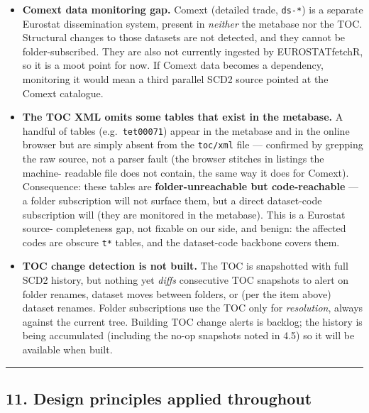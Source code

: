\documentclass[
]{article}
\begin{document}
\begin{itemize}
  by the scheduled account, all alerting fails silently --- no alerts,
  no failure emails. \emph{Mitigation:} periodically confirm alerts
  still arrive; consider a heartbeat or second channel if the system
  becomes critical.
\item
  \textbf{Comext data monitoring gap.} Comext (detailed trade,
  \texttt{ds-*}) is a separate Eurostat dissemination system, present in
  \emph{neither} the metabase nor the TOC. Structural changes to those
  datasets are not detected, and they cannot be folder-subscribed. They
  are also not currently ingested by EUROSTATfetchR, so it is a moot
  point for now. If Comext data becomes a dependency, monitoring it
  would mean a third parallel SCD2 source pointed at the Comext
  catalogue.
\item
  \textbf{The TOC XML omits some tables that exist in the metabase.} A
  handful of tables (e.g.~\texttt{tet00071}) appear in the metabase and
  in the online browser but are simply absent from the \texttt{toc/xml}
  file --- confirmed by grepping the raw source, not a parser fault (the
  browser stitches in listings the machine- readable file does not
  contain, the same way it does for Comext). Consequence: these tables
  are \textbf{folder-unreachable but code-reachable} --- a folder
  subscription will not surface them, but a direct dataset-code
  subscription will (they are monitored in the metabase). This is a
  Eurostat source- completeness gap, not fixable on our side, and
  benign: the affected codes are obscure \texttt{t*} tables, and the
  dataset-code backbone covers them.
\item
  \textbf{TOC change detection is not built.} The TOC is snapshotted
  with full SCD2 history, but nothing yet \emph{diffs} consecutive TOC
  snapshots to alert on folder renames, dataset moves between folders,
  or (per the item above) dataset renames. Folder subscriptions use the
  TOC only for \emph{resolution}, always against the current tree.
  Building TOC change alerts is backlog; the history is being
  accumulated (including the no-op snapshots noted in 4.5) so it will be
  available when built.
\end{itemize}

\begin{center}\rule{0.5\linewidth}{0.5pt}\end{center}

\subsection{11. Design principles applied
throughout}\label{design-principles-applied-throughout}
\end{document}
